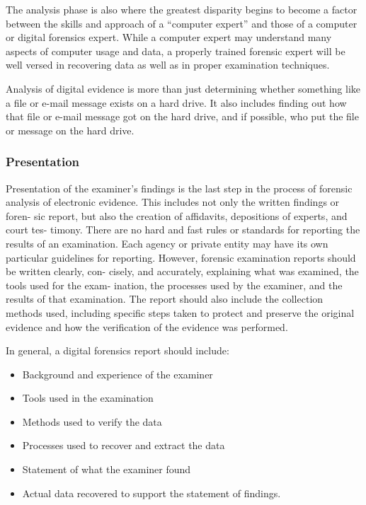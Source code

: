 The analysis phase is also where the greatest disparity begins to become a factor
between the skills and approach of a “computer expert” and those of a computer or
digital forensics expert. While a computer expert may understand many aspects of
computer usage and data, a properly trained forensic expert will be well versed in
recovering data as well as in proper examination techniques.

Analysis of digital evidence is more than just determining whether something
like a file or e-mail message exists on a hard drive. It also includes finding out how
that file or e-mail message got on the hard drive, and if possible, who put the file or
message on the hard drive.

\subsubsection{Presentation}

Presentation of the examiner’s findings is the last step in the process of forensic
analysis of electronic evidence. This includes not only the written findings or foren-
sic report, but also the creation of affidavits, depositions of experts, and court tes-
timony. There are no hard and fast rules or standards for reporting the results of an
examination. Each agency or private entity may have its own particular guidelines
for reporting. However, forensic examination reports should be written clearly, con-
cisely, and accurately, explaining what was examined, the tools used for the exam-
ination, the processes used by the examiner, and the results of that examination.
The report should also include the collection methods used, including specific steps
taken to protect and preserve the original evidence and how the verification of the
evidence was performed.

In general, a digital forensics report should include:

\begin{itemize}
\item Background and experience of the examiner
\item Tools used in the examination
\item Methods used to verify the data
\item Processes used to recover and extract the data
\item Statement of what the examiner found
\item Actual data recovered to support the statement of findings.
\end{itemize}

